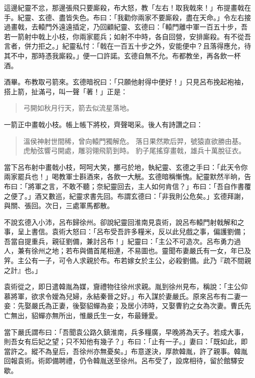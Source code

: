 這邊紀靈不忿，那邊張飛只要廝殺，布大怒，教「左右！取我戟來！」布提畫戟在手。紀靈、玄德、盡皆失色。布曰：「我勸你兩家不要廝殺，盡在天命。」令左右接過畫戟，去轅門外遠遠插定，乃回顧紀靈、玄德曰：「轅門離中軍一百五十步，吾若一箭射中戟上小枝，你兩家罷兵；如射不中時，各自回營，安排廝殺。有不從吾言者，併力拒之。」紀靈私忖：「戟在一百五十步之外，安能便中？且落得應允，待其不中，那時憑我廝殺。」便一口許諾。玄德自無不允。布都教坐，再各飲一杯酒。

酒畢。布教取弓箭來。玄德暗祝曰：「只願他射得中便好！」只見呂布挽起袍袖，搭上箭，扯滿弓，叫一聲「著！」正是：

\begin{quote}
弓開如秋月行天，箭去似流星落地。
\end{quote}

一箭正中畫戟小枝。帳上帳下將校，齊聲喝采。後人有詩讚之曰：

\begin{quote}
溫侯神射世間稀，曾向轅門獨解危。
落日果然欺后羿，號猿直欲勝由基。
虎觔弦響弓開處，雕羽翎飛箭到時。
豹子尾搖穿畫戟，雄兵十萬脫征衣。
\end{quote}

當下呂布射中畫戟小枝，呵呵大笑，擲弓於地，執紀靈、玄德之手曰：「此天令你兩家罷兵也！」喝教軍士斟酒來，各飲一大觥。玄德暗稱慚愧。紀靈默然半晌，告布曰：「將軍之言，不敢不聽；奈紀靈回去，主人如何肯信？」布曰：「吾自作書覆之便了。」酒又數巡，紀靈求書先回。布謂玄德曰：「非我則公危矣。」玄德拜謝，與關、張回。次日，三處軍馬都散。

不說玄德入小沛，呂布歸徐州。卻說紀靈回淮南見袁術，說呂布轅門射戟解和之事，呈上書信。袁術大怒曰：「呂布受吾許多糧米，反以此兒戲之事，偏護劉備；吾當自提重兵，親征劉備，兼討呂布！」紀靈曰：「主公不可造次。呂布勇力過人，兼有徐州之地；若布與備首尾相連，不易圖也。靈聞布妻嚴氏有一女，年已及笄。主公有一子，可令人求親於布。布若嫁女於主公，必殺劉備。此乃『疏不間親之計』也。」

袁術從之，即日遣韓胤為媒，齎禮物往徐州求親。胤到徐州見布，稱說：「主公仰慕將軍，欲求令嬡為兒婦，永結秦晉之好。」布入謀於妻嚴氏。原來呂布有二妻一妾：先娶嚴氏為正妻，後娶貂蟬為妾；及居小沛時，又娶曹豹之女為次妻。曹氏先亡無出，貂蟬亦無所出，惟嚴氏生一女，布最鍾愛。

當下嚴氏謂布曰：「吾聞袁公路久鎮淮南，兵多糧廣，早晚將為天子。若成大事，則吾女有后妃之望；只不知他有幾子？」布曰：「止有一子。」妻曰：「既如此，即當許之。縱不為皇后，吾徐州亦無憂矣。」布意遂決，厚款韓胤，許了親事。韓胤回報袁術。術即備聘禮，仍令韓胤送至徐州。呂布受了，設席相待，留於館驛安歇。

